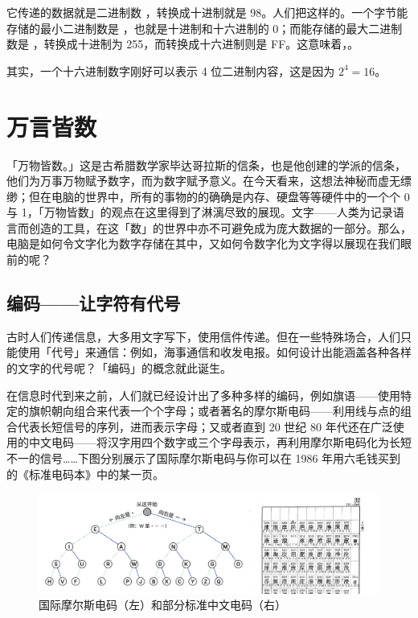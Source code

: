 它传递的数据就是二进制数 ，转换成十进制就是 98。人们把这样的。一个字节能存储的最小二进制数是 ，也就是十进制和十六进制的 0；而能存储的最大二进制数是 ，转换成十进制为 255，而转换成十六进制则是 FF。这意味着，。

\begin{note}
  其实，一个十六进制数字刚好可以表示 4 位二进制内容，这是因为 $2^4=16$。
\end{note}

\section{万言皆数}

「万物皆数。」这是古希腊数学家毕达哥拉斯的信条，也是他创建的学派的信条，他们为万事万物赋予数字，而为数字赋予意义。在今天看来，这想法神秘而虚无缥缈；但在电脑的世界中，所有的事物的的确确是内存、硬盘等等硬件中的一个个 0 与 1，「万物皆数」的观点在这里得到了淋漓尽致的展现。文字——人类为记录语言而创造的工具，在这「数」的世界中亦不可避免成为庞大数据的一部分。那么，电脑是如何令文字化为数字存储在其中，又如何令数字化为文字得以展现在我们眼前的呢？

\subsection{编码——让字符有代号}

古时人们传递信息，大多用文字写下，使用信件传递。但在一些特殊场合，人们只能使用「代号」来通信：例如，海事通信和收发电报。如何设计出能涵盖各种各样的文字的代号呢？「编码」的概念就此诞生。

在信息时代到来之前，人们就已经设计出了多种多样的编码，例如旗语——使用特定的旗帜朝向组合来代表一个个字母；或者著名的摩尔斯电码——利用线与点的组合代表长短信号的序列，进而表示字母；又或者直到 20 世纪 80 年代还在广泛使用的中文电码——将汉字用四个数字或三个字母表示，再利用摩尔斯电码化为长短不一的信号……下图分别展示了国际摩尔斯电码与你可以在 1986 年用六毛钱买到的《标准电码本》中的某一页。

\begin{figure}[htb!]
  \centering
  \includegraphics[width=.95\textwidth]{assets/advanced/TelegraphCode.jpg}
  \caption{国际摩尔斯电码（左）和部分标准中文电码（右）}
  \label{fig:TelegraphCode}
\end{figure}

